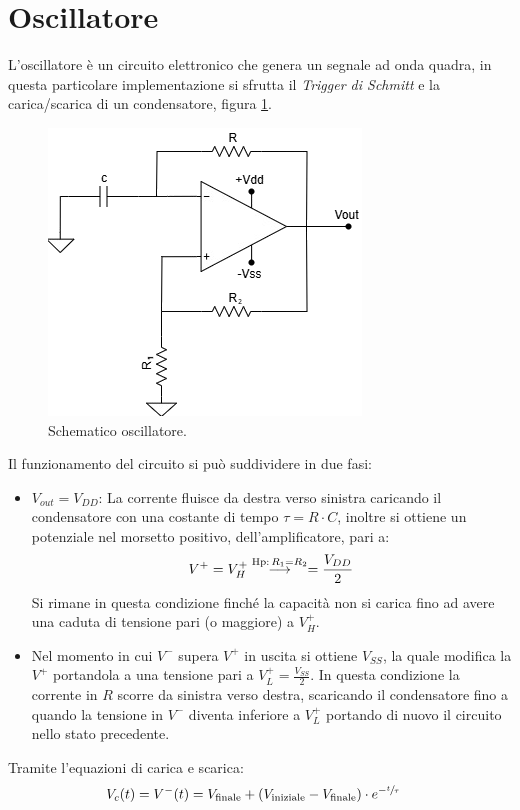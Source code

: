 \documentclass[a4paper,12pt]{article}
\begin{document}
\section*{Oscillatore}
L'oscillatore è un circuito elettronico che genera un segnale ad onda quadra, in questa particolare implementazione si sfrutta il \textit{Trigger di Schmitt} e la carica/scarica di un condensatore, figura \ref{fig:schematico_oscillatore}.
\begin{figure}
	\centering
	\includegraphics[width=0.4\linewidth]{immagini/ocillatore/circuito.png}
	\caption{Schematico oscillatore.}
	\label{fig:schematico_oscillatore}
\end{figure}
Il funzionamento del circuito si può suddividere in due fasi:
\begin{itemize}
    \item $V_{out} = V_{DD}$: La corrente fluisce da destra verso sinistra caricando il condensatore con una costante di tempo $\tau = R \cdot C$, inoltre si ottiene un potenziale nel morsetto positivo, dell'amplificatore, pari a:
    \begin{align*}
        V^+ = V^+_H \overset{\tiny\mathrm{Hp:}\,R_1 = R_2}{\longrightarrow} = \frac{V_{DD}}{2}
    \end{align*}
    Si rimane in questa condizione finché la capacità non si carica fino ad avere una caduta di tensione pari (o maggiore) a $V^+_H$.
    \item Nel momento in cui $V^-$ supera $V^+$ in uscita si ottiene $V_{SS}$, la quale modifica la $V^+$ portandola a una tensione pari a $V^+_L = \frac{V_{SS}}{2}$. In questa condizione la corrente in $R$ scorre da sinistra verso destra, scaricando il condensatore fino a quando la tensione in $V^-$ diventa inferiore a $V^+_L$ portando di nuovo il circuito nello stato precedente. 
\end{itemize}
Tramite l'equazioni di carica e scarica:
\begin{align*}
    V_c (t) = V^- (t) &= V_{\text{finale}} + (V_{\text{iniziale}} - V_{\text{finale}} ) \cdot e^{-\sfrac{t}{\tau}}
\end{align*}
\end{document}
